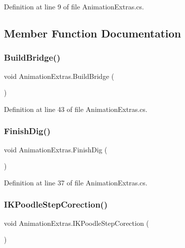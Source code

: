 Definition at line 9 of file Animation\+Extras.\+cs.



\subsection{Member Function Documentation}
\mbox{\label{class_animation_extras_a4065dec8cbea298f0fb3d77287ffc525}} 
\subsubsection{\texorpdfstring{Build\+Bridge()}{BuildBridge()}}
{\footnotesize\ttfamily void Animation\+Extras.\+Build\+Bridge (\begin{DoxyParamCaption}{ }\end{DoxyParamCaption})}



Definition at line 43 of file Animation\+Extras.\+cs.

\mbox{\label{class_animation_extras_a7feae62a6bb9889a3b439efd5ba38389}} 
\subsubsection{\texorpdfstring{Finish\+Dig()}{FinishDig()}}
{\footnotesize\ttfamily void Animation\+Extras.\+Finish\+Dig (\begin{DoxyParamCaption}{ }\end{DoxyParamCaption})}



Definition at line 37 of file Animation\+Extras.\+cs.

\mbox{\label{class_animation_extras_a9117c4bbf2a42e5b2996a081fcba07cc}} 
\subsubsection{\texorpdfstring{I\+K\+Poodle\+Step\+Corection()}{IKPoodleStepCorection()}}
{\footnotesize\ttfamily void Animation\+Extras.\+I\+K\+Poodle\+Step\+Corection (\begin{DoxyParamCaption}{ }\end{DoxyParamCaption})}



